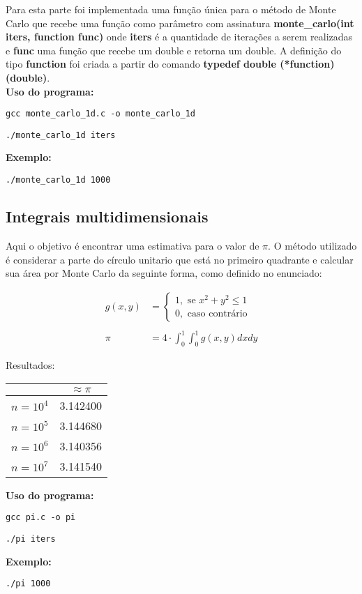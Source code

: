 \documentclass[leqno]{article}
\begin{document}
Para esta parte foi implementada uma função única para o método de Monte Carlo
que recebe uma função como parâmetro com assinatura
\textbf{monte\_carlo(int iters, function func)} onde \textbf{iters}
é a quantidade de iterações a serem realizadas e \textbf{func} uma função que
recebe um double e retorna um double. A definição do tipo \textbf{function} foi criada
a partir do comando \textbf{typedef double (*function)(double)}.
\\

\textbf{Uso do programa:}

\texttt{gcc monte\_carlo\_1d.c -o monte\_carlo\_1d}

\texttt{./monte\_carlo\_1d iters}

\textbf{Exemplo:}

\texttt{./monte\_carlo\_1d 1000}


\subsection{Integrais multidimensionais}
Aqui o objetivo é encontrar uma estimativa para o valor de $\pi$. O método utilizado
é considerar a parte do círculo unitario que está no primeiro quadrante e calcular
sua área por Monte Carlo da seguinte forma, como definido no enunciado:

\begin{align*}
    g(x,y) &= \begin{cases}
        1, \text{   se } x^2 + y^2 \leq 1 \\
        0, \text{   caso contrário}
    \end{cases}\\
    \\
    \pi &= 4 \cdot \int_0^1\int_0^1 g(x,y)dxdy
\end{align*}

Resultados:
\begin{table}[H]
    \centering
    \begin{tabular}{c|c|}
    \cline{2-2}
                                     & $\approx \pi$ \\ \hline
    \multicolumn{1}{|c|}{$n = 10^4$} & 3.142400      \\ \hline
    \multicolumn{1}{|c|}{$n = 10^5$} & 3.144680      \\ \hline
    \multicolumn{1}{|c|}{$n = 10^6$} & 3.140356      \\ \hline
    \multicolumn{1}{|c|}{$n = 10^7$} & 3.141540      \\ \hline
    \end{tabular}
\end{table}

\textbf{Uso do programa:}

\texttt{gcc pi.c -o pi}

\texttt{./pi iters}

\textbf{Exemplo:}

\texttt{./pi 1000}
\end{document}
